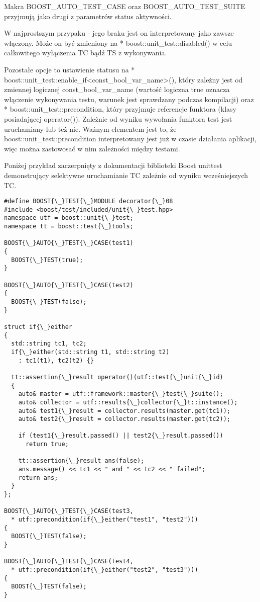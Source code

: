 \documentclass[12pt,a4paper,notitlepage]{report}
\begin{document}
Makra BOOST{\_}AUTO{\_}TEST{\_}CASE oraz BOOST{\_}AUTO{\_}TEST{\_}SUITE przyjmują jako drugi z parametrów status aktywności.

W najprostszym przypaku - jego braku jest on interpretowany jako zawsze włączony. Może on być zmieniony na * boost::unit{\_}test::disabled() w celu całkowitego wyłączenia TC bądź TS z wykonywania. 

Pozostałe opcje to ustawienie statusu na * boost::unit{\_}test::enable{\_}if<const{\_}bool{\_}var{\_}name>(), który zależny jest od zmiennej logicznej const{\_}bool{\_}var{\_}name (wartość logiczna true oznacza włączenie wykonywania testu, warunek jest sprawdzany podczas kompilacji) oraz * boost::unit{\_}test::precondition, który przyjmuje referencje funktora (klasy posiadającej operator()). Zależnie od wyniku wywołania funktora test jest uruchamiany lub też nie. Ważnym elementem jest to, że boost::unit{\_}test::precondition interpretowany jest już w czasie działania aplikacji, więc można zastowosać w nim zależności między testami.

Poniżej przykład zaczerpnięty z dokumentacji biblioteki Boost unittest demonstrujący selektywne uruchamianie TC zależnie od wyniku wcześniejszych TC.

		\begin{lstlisting}[label=some-code,caption=Listing programu rysującego model jajka w 3D]
#define BOOST{\_}TEST{\_}MODULE decorator{\_}08
#include <boost/test/included/unit{\_}test.hpp>
namespace utf = boost::unit{\_}test;
namespace tt = boost::test{\_}tools;

BOOST{\_}AUTO{\_}TEST{\_}CASE(test1)
{
  BOOST{\_}TEST(true);
}

BOOST{\_}AUTO{\_}TEST{\_}CASE(test2)
{
  BOOST{\_}TEST(false);
}

struct if{\_}either
{
  std::string tc1, tc2;
  if{\_}either(std::string t1, std::string t2)
    : tc1(t1), tc2(t2) {}

  tt::assertion{\_}result operator()(utf::test{\_}unit{\_}id)
  {
    auto& master = utf::framework::master{\_}test{\_}suite();
    auto& collector = utf::results{\_}collector{\_}t::instance();
    auto& test1{\_}result = collector.results(master.get(tc1));
    auto& test2{\_}result = collector.results(master.get(tc2));

    if (test1{\_}result.passed() || test2{\_}result.passed())
      return true;

    tt::assertion{\_}result ans(false);
    ans.message() << tc1 << " and " << tc2 << " failed";
    return ans;
  }
};

BOOST{\_}AUTO{\_}TEST{\_}CASE(test3,
  * utf::precondition(if{\_}either("test1", "test2")))
{
  BOOST{\_}TEST(false);
}

BOOST{\_}AUTO{\_}TEST{\_}CASE(test4,
  * utf::precondition(if{\_}either("test2", "test3")))
{
  BOOST{\_}TEST(false);
}
		\end{lstlisting}
\end{document}
